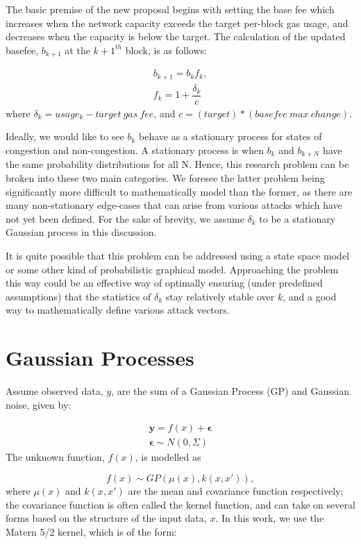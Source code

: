 \documentclass[peerreview]{ieeesyscoin}
\begin{document}
The basic premise of the new proposal begins with setting the base fee which increases when the network capacity exceeds the target per-block gas usage, and decreases when the capacity is below the target. The calculation of the updated basefee, $b_{k+1}$ at the $k+1^{th}$ block,  is as follows:

\begin{eqnarray} \label{eq:eip1559}
b_{k+1} = b_{k} f_{k}, \\
f_{k} = 1 + \dfrac{\delta_{k}}{c}
\end{eqnarray}
where $\delta_{k} = usage_{k} - target~gas~fee$, and $c = (target)*(basefee~max~change)$.

Ideally, we would like to see $b_{k}$ behave as a stationary process for states of congestion and non-congestion. A stationary process is when $b_{k}$ and $b_{k+N}$ have the same probability distributions for all N. Hence, this research problem can be broken into these two main categories. We foresee the latter problem being significantly more difficult to mathematically model than the former, as there are many non-stationary edge-cases that can arise from various attacks which have not yet been defined. For the sake of brevity, we assume $\delta_{k}$ to be a stationary Gaussian process in this discussion.

It is quite possible that this problem can be addressed using a state space model or some other kind of probabilistic graphical model. Approaching the problem this way could be an effective way of optimally ensuring (under predefined assumptions) that the statistics of $\delta_{k}$ stay relatively stable over $k$, and a good way to mathematically define various attack vectors.

\section{Gaussian Processes}
\label{appendix:marginal}

Assume observed data, $y$, are the sum of a Gaussian Process (GP) and Gaussian noise, given by:

\begin{eqnarray}
\mathbf{y} = f(x) + \mathbf{\epsilon}  \\
\mathbf{\epsilon}  \sim N(0,\Sigma) 
\end{eqnarray}
The unknown function, $f(x)$, is modelled as

\begin{equation}
f(x) \sim GP(\mu(x), k(x,x')),
\end{equation}
where $\mu(x)$ and $k(x,x')$ are the mean and covariance function respectively; the covariance function is often called the kernel function, and can take on several forms based on the structure of the input data, $x$. In this work, we use the Matern 5/2 kernel, which is of the form:
\end{document}
